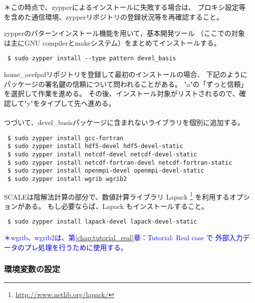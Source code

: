 {\small ＊この時点で、zypperによるインストールに失敗する場合は、
プロキシ設定等を含めた通信環境、zypperリポジトリの登録状況等を再確認すること。}

\noindent zypperのパターンインストール機能を用いて，基本開発ツール
（ここでの対象は主にGNU compilerとmakeシステム）をまとめてインストールする。
\begin{verbatim}
 $ sudo zypper install --type pattern devel_basis
\end{verbatim}

home\_ocefpafリポジトリを登録して最初のインストールの場合、
下記のようにパッケージの署名鍵の信頼について問われることがある。
"a"の「ずっと信頼」を選択して作業を進める。
その後、インストール対象がリストされるので、確認して"y"をタイプして先へ進める。\\

\\

\noindent つづいて、devel\_basisパッケージに含まれないライブラリを個別に追加する。
\begin{verbatim}
 $ sudo zypper install gcc-fortran
 $ sudo zypper install hdf5-devel hdf5-devel-static
 $ sudo zypper install netcdf-devel netcdf-devel-static
 $ sudo zypper install netcdf-fortran-devel netcdf-fortran-static
 $ sudo zypper install openmpi-devel openmpi-devel-static
 $ sudo zypper install wgrib wgrib2
\end{verbatim}

SCALEは陰解法計算の部分で、数値計算ライブラリ Lapack
\footnote{\url{http://www.netlib.org/lapack/}}
を利用するオプションがある。
もし必要ならば、Lapack もインストールすること。
\begin{verbatim}
 $ sudo zypper install lapack-devel lapack-devel-static
\end{verbatim}

\noindent \textcolor{blue}{\small ＊wgrib、wgrib2は、第\ref{chap:tutorial_real}章：Tutorial: Real case で
外部入力データのプレ処理を行うために使用する。}


\subsubsection{環境変数の設定}

